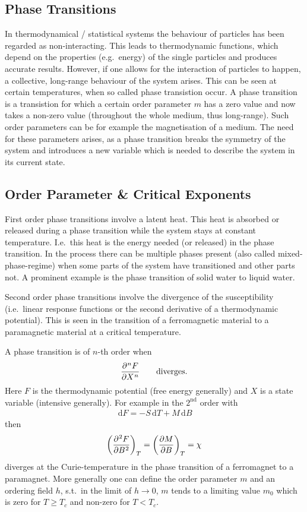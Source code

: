 \documentclass[a4paper,10pt]{article}
\newcommand{\td}{\,\text{d}}
\numberwithin{equation}{section}
\begin{document}
\begin{multicols}{2}
\section{Phase Transitions}
In thermodynamical / statistical systems the behaviour of particles has been regarded as non-interacting.
This leads to thermodynamic functions, which depend on the properties (e.g.\ energy) of the single particles and produces accurate results.
However, if one allows for the interaction of particles to happen, a collective, long-range behaviour of the system arises.
This can be seen at certain temperatures, when so called phase transistion occur.
A phase transition is a transistion for which a certain order parameter $m$ has a zero value and now takes a non-zero value (throughout the whole medium, thus long-range).
Such order parameters can be for example the magnetisation of a medium.
The need for these parameters arises, as a phase transition breaks the symmetry of the system and introduces a new variable which is needed to describe the system in its current state.

\subsection{Order Parameter \& Critical Exponents}
First order phase transitions involve a latent heat.
This heat is absorbed or released during a phase transition while the system stays at constant temperature.
I.e.\ this heat is the energy needed (or released) in the phase transition.
In the process there can be multiple phases present (also called mixed-phase-regime) when some parts of the system have transitioned and other parts not.
A prominent example is the phase transition of solid water to liquid water.

Second order phase transitions involve the divergence of the susceptibility (i.e.\ linear response functions or the second derivative of a thermodynamic potential).
This is seen in the transition of a ferromagnetic material to a paramagnetic material at a critical temperature.

A phase transition is of $n$-th order when 
\begin{align} 
  \diffp[n]{F}{X}\qquad \text{diverges}
.\end{align} 
Here $F$ is the thermodynamic potential (free energy generally) and $X$ is a state variable (intensive generally).
For example in the $2^\text{nd}$ order with 
\begin{align} 
  \td F=-S\td T+M\td B
\end{align} 
then
\begin{align} 
  \left(\diffp[2]{F}{B}\right)_T=\left(\diffp[]{M}{B}\right)_T=\chi 
\end{align} 
diverges at the Curie-temperature in the phase transition of a ferromagnet to a paramagnet.
More generally one can define the order parameter $m$ and an ordering field $h$, s.t.\ in the limit of $h\rightarrow 0$, $m$ tends to a limiting value $m_0$ which is zero for $T\geq T_c$ and non-zero for $T<T_c$.


\end{multicols}
\end{document}
